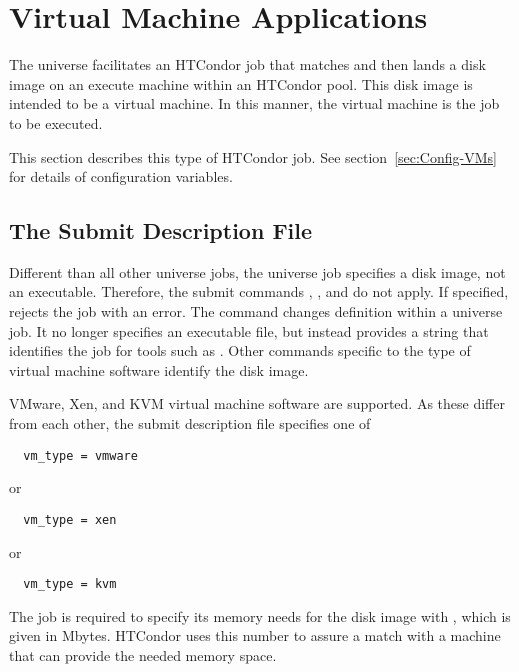 \section{Virtual Machine Applications}\label{sec:vmuniverse}

The  universe facilitates an HTCondor job
that matches and then lands a disk image on an execute machine
within an HTCondor pool.
This disk image is intended to be a virtual machine.
In this manner, the virtual machine is the job to be executed.

This section describes this type of HTCondor job.
See section~\ref{sec:Config-VMs}
for details of configuration variables.

\subsection{\label{sec:vm-submitfile}The Submit Description File}

Different than all other universe jobs,
the  universe job specifies a disk image,
not an executable.
Therefore, the submit commands , ,
and  do not apply.
If specified,  rejects the job with an error.
The  command changes definition within a
 universe job.
It no longer specifies an executable file, but instead
provides a string that identifies the job for tools such
as .
Other commands specific to the type of virtual machine software
identify the disk image.

VMware, Xen, and KVM virtual machine software are supported.
As these differ from each other, the submit description file
specifies one of
\begin{verbatim}
  vm_type = vmware
\end{verbatim}
or
\begin{verbatim}
  vm_type = xen
\end{verbatim}
or
\begin{verbatim}
  vm_type = kvm
\end{verbatim}

The job is required to specify its memory needs 
for the disk image with ,
which is given in Mbytes.
HTCondor uses this number to assure a match with a machine
that can provide the needed memory space.


